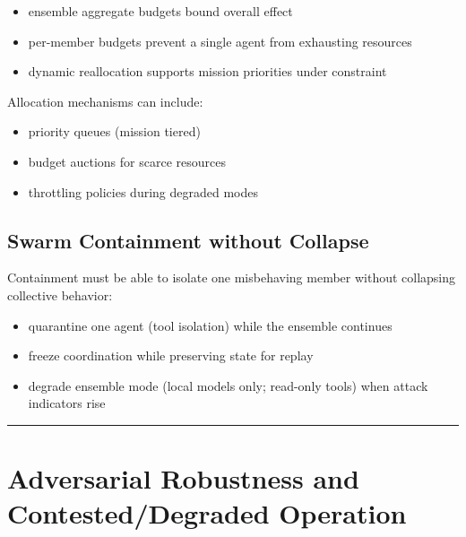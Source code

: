 \documentclass[11pt]{article}
\begin{document}
\begin{itemize}
\tightlist
\item
  ensemble aggregate budgets bound overall effect
\item
  per-member budgets prevent a single agent from exhausting resources
\item
  dynamic reallocation supports mission priorities under constraint
\end{itemize}

Allocation mechanisms can include:

\begin{itemize}
\tightlist
\item
  priority queues (mission tiered)
\item
  budget auctions for scarce resources
\item
  throttling policies during degraded modes
\end{itemize}

\hypertarget{swarm-containment-without-collapse}{%
\subsection{Swarm Containment without Collapse}\label{swarm-containment-without-collapse}}

Containment must be able to isolate one misbehaving member without
collapsing collective behavior:

\begin{itemize}
\tightlist
\item
  quarantine one agent (tool isolation) while the ensemble continues
\item
  freeze coordination while preserving state for replay
\item
  degrade ensemble mode (local models only; read-only tools) when attack
  indicators rise
\end{itemize}

\vspace{2pt}\begin{center}\rule{0.62\linewidth}{0.6pt}\end{center}\vspace{2pt}

\hypertarget{adversarial-robustness-and-contesteddegraded-operation}{%
\section{Adversarial Robustness and Contested/Degraded Operation}\label{adversarial-robustness-and-contesteddegraded-operation}}
\end{document}

